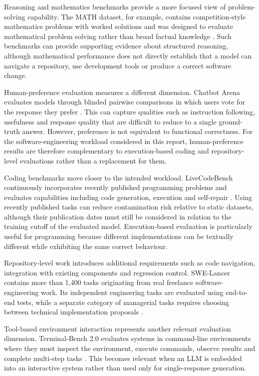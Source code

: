 Reasoning and mathematics benchmarks provide a more focused view of problem-solving capability. The MATH dataset, for example, contains competition-style mathematics problems with worked solutions and was designed to evaluate mathematical problem solving rather than broad factual knowledge \parencite{hendrycks2021math}. Such benchmarks can provide supporting evidence about structured reasoning, although mathematical performance does not directly establish that a model can navigate a repository, use development tools or produce a correct software change.

Human-preference evaluation measures a different dimension. Chatbot Arena evaluates models through blinded pairwise comparisons in which users vote for the response they prefer \parencite{chiang2024arena}. This can capture qualities such as instruction following, usefulness and response quality that are difficult to reduce to a single ground-truth answer. However, preference is not equivalent to functional correctness. For the software-engineering workload considered in this report, human-preference results are therefore complementary to execution-based coding and repository-level evaluations rather than a replacement for them.

Coding benchmarks move closer to the intended workload. LiveCodeBench continuously incorporates recently published programming problems and evaluates capabilities including code generation, execution and self-repair \parencite{jain2024livecodebench}. Using recently published tasks can reduce contamination risk relative to static datasets, although their publication dates must still be considered in relation to the training cutoff of the evaluated model. Execution-based evaluation is particularly useful for programming because different implementations can be textually different while exhibiting the same correct behaviour.

Repository-level work introduces additional requirements such as code navigation, integration with existing components and regression control. SWE-Lancer contains more than 1,400 tasks originating from real freelance software-engineering work. Its independent engineering tasks are evaluated using end-to-end tests, while a separate category of managerial tasks requires choosing between technical implementation proposals \parencite{miserendino2025swelancer}.

Tool-based environment interaction represents another relevant evaluation dimension. Terminal-Bench 2.0 evaluates systems in command-line environments where they must inspect the environment, execute commands, observe results and complete multi-step tasks \parencite{merrill2026terminalbench}. This becomes relevant when an LLM is embedded into an interactive system rather than used only for single-response generation.


